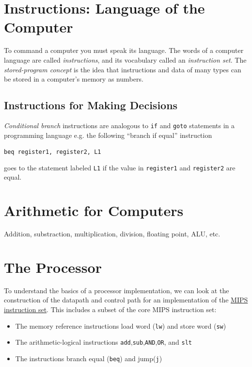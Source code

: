 \documentclass[10pt,a4paper]{article}
\begin{document}
\section{Instructions: Language of the Computer}

To command a computer you must speak its language. The words of a computer language are called \textit{instructions}, and its vocabulary called an \textit{instruction set}. The \textit{stored-program concept} is the idea that instructions and data of many types can be stored in a computer's memory as numbers.

\subsection{Instructions for Making Decisions}

\textit{Conditional branch} instructions are analogous to \verb|if| and \verb|goto| statements in a programming language e.g. the following ``branch if equal'' instruction
\begin{center}
    \verb|beq register1, register2, L1|
\end{center}
goes to the statement labeled \verb|L1| if the value in \verb|register1| and \verb|register2| are equal.


\section{Arithmetic for Computers}

Addition, substraction, multiplication, division, floating point, ALU, etc.

\section{The Processor}

To understand the basics of a processor implementation, we can look at the construction of the datapath and control path for an implementation of the \href{https://en.wikipedia.org/wiki/MIPS_architecture}{MIPS instruction set}. This includes a subset of the core MIPS instruction set:
\begin{itemize}
    \item The memory reference instructions load word (\verb|lw|) and store word (\verb|sw|)
    \item The arithmetic-logical instructions \verb|add|,\verb|sub|,\verb|AND|,\verb|OR|, and \verb|slt|
    \item The instructions branch equal (\verb|beq|) and jump(\verb|j|)
\end{itemize}
\end{document}
